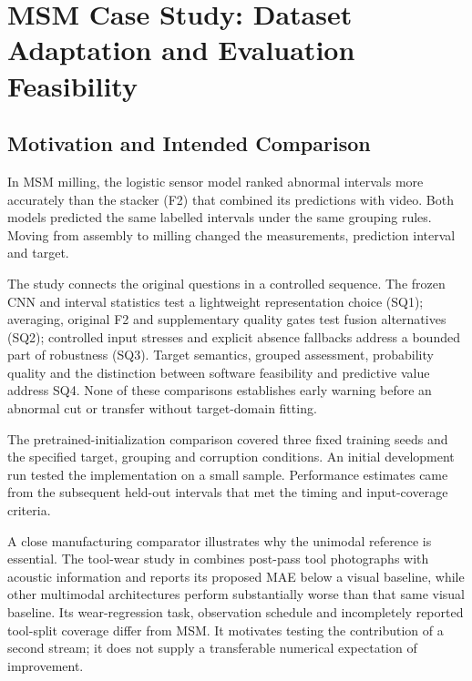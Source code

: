 \chapter{MSM Case Study: Dataset Adaptation and Evaluation Feasibility}
\label{ch:msm}

\section{Motivation and Intended Comparison}
In MSM milling, the logistic sensor model ranked abnormal intervals more accurately than the stacker (F2) that combined its predictions with video. Both models predicted the same labelled intervals under the same grouping rules. Moving from assembly to milling changed the measurements, prediction interval and target.

The study connects the original questions in a controlled sequence. The frozen CNN and interval statistics test a lightweight representation choice (SQ1); averaging, original F2 and supplementary quality gates test fusion alternatives (SQ2); controlled input stresses and explicit absence fallbacks address a bounded part of robustness (SQ3). Target semantics, grouped assessment, probability quality and the distinction between software feasibility and predictive value address SQ4. None of these comparisons establishes early warning before an abnormal cut or transfer without target-domain fitting.

The pretrained-initialization comparison covered three fixed training seeds and the specified target, grouping and corruption conditions. An initial development run tested the implementation on a small sample. Performance estimates came from the subsequent held-out intervals that met the timing and input-coverage criteria.

A close manufacturing comparator illustrates why the unimodal reference is essential. The tool-wear study in \citet{P045} combines post-pass tool photographs with acoustic information and reports its proposed MAE below a visual baseline, while other multimodal architectures perform substantially worse than that same visual baseline. Its wear-regression task, observation schedule and incompletely reported tool-split coverage differ from MSM. It motivates testing the contribution of a second stream; it does not supply a transferable numerical expectation of improvement.

